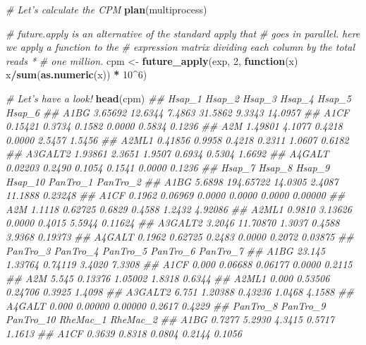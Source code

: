 \documentclass[]{book}
\newenvironment{Shaded}{\begin{snugshade}}{\end{snugshade}}
\newcommand{\CommentTok}[1]{\textcolor[rgb]{0.56,0.35,0.01}{\textit{#1}}}
\newcommand{\ControlFlowTok}[1]{\textcolor[rgb]{0.13,0.29,0.53}{\textbf{#1}}}
\newcommand{\DecValTok}[1]{\textcolor[rgb]{0.00,0.00,0.81}{#1}}
\newcommand{\KeywordTok}[1]{\textcolor[rgb]{0.13,0.29,0.53}{\textbf{#1}}}
\newcommand{\NormalTok}[1]{#1}
\newcommand{\OperatorTok}[1]{\textcolor[rgb]{0.81,0.36,0.00}{\textbf{#1}}}
\newcommand{\StringTok}[1]{\textcolor[rgb]{0.31,0.60,0.02}{#1}}
\begin{document}
\begin{Shaded}
\begin{Highlighting}[]
\CommentTok{# Let's calculate the CPM}
\KeywordTok{plan}\NormalTok{(multiprocess)}

\CommentTok{# future.apply is an alternative of the standard apply that}
\CommentTok{# goes in parallel.  here we apply a function to the}
\CommentTok{# expression matrix dividing each column by the total reads *}
\CommentTok{# one million.}
\NormalTok{cpm <-}\StringTok{ }\KeywordTok{future_apply}\NormalTok{(exp, }\DecValTok{2}\NormalTok{, }\ControlFlowTok{function}\NormalTok{(x) x}\OperatorTok{/}\KeywordTok{sum}\NormalTok{(}\KeywordTok{as.numeric}\NormalTok{(x)) }\OperatorTok{*}\StringTok{ }
\StringTok{  }\DecValTok{10}\OperatorTok{^}\DecValTok{6}\NormalTok{)}

\CommentTok{# Let's have a look!}
\KeywordTok{head}\NormalTok{(cpm)}
\CommentTok{##          Hsap_1  Hsap_2 Hsap_3  Hsap_4 Hsap_5  Hsap_6}
\CommentTok{## A1BG    3.65692 12.6344 7.4863 31.5862 9.3343 14.0957}
\CommentTok{## A1CF    0.15421  0.3734 0.1582  0.0000 0.5834  0.1236}
\CommentTok{## A2M     1.49801  4.1077 0.4218  0.0000 2.5457  1.5456}
\CommentTok{## A2ML1   0.41856  0.9958 0.4218  0.2311 1.0607  0.6182}
\CommentTok{## A3GALT2 1.93861  2.3651 1.9507  0.6934 0.5304  1.6692}
\CommentTok{## A4GALT  0.02203  0.2490 0.1054  0.1541 0.0000  0.1236}
\CommentTok{##         Hsap_7    Hsap_8  Hsap_9 Hsap_10 PanTro_1 PanTro_2}
\CommentTok{## A1BG    5.6898 194.65722 14.0305  2.4087  11.1888  0.23248}
\CommentTok{## A1CF    0.1962   0.06969  0.0000  0.0000   0.0000  0.00000}
\CommentTok{## A2M     1.1118   0.62725  0.6829  0.4588   1.2432  4.92086}
\CommentTok{## A2ML1   0.9810   3.13626  0.0000  0.4015   5.5944  0.11624}
\CommentTok{## A3GALT2 3.2046  11.70870  1.3037  0.4588   3.9368  0.19373}
\CommentTok{## A4GALT  0.1962   0.62725  0.2483  0.0000   0.2072  0.03875}
\CommentTok{##         PanTro_3 PanTro_4 PanTro_5 PanTro_6 PanTro_7}
\CommentTok{## A1BG      23.145  1.33764  0.74119   3.4020   7.3308}
\CommentTok{## A1CF       0.000  0.06688  0.06177   0.0000   0.2115}
\CommentTok{## A2M        5.545  0.13376  1.05002   1.8318   0.6344}
\CommentTok{## A2ML1      0.000  0.53506  0.24706   0.3925   1.4098}
\CommentTok{## A3GALT2    6.751  1.20388  0.43236   1.0468   4.1588}
\CommentTok{## A4GALT     0.000  0.00000  0.00000   0.2617   0.4229}
\CommentTok{##         PanTro_8 PanTro_9 PanTro_10 RheMac_1 RheMac_2}
\CommentTok{## A1BG      0.7277   5.2930    4.3415   0.5717   1.1613}
\CommentTok{## A1CF      0.3639   0.8318    0.0804   0.2144   0.1056}

\end{Highlighting}
\end{Shaded}
\end{document}
